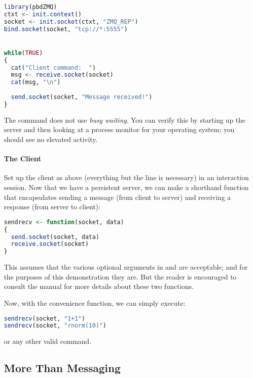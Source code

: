 \begin{lstlisting}[language=R,title=Server]
library(pbdZMQ)
ctxt <- init.context()
socket <- init.socket(ctxt, "ZMQ_REP")
bind.socket(socket, "tcp://*:5555")


while(TRUE)
{
  cat("Client command:  ")
  msg <- receive.socket(socket)
  cat(msg, "\n")
  
  send.socket(socket, "Message received!")
}
\end{lstlisting}

The  command does not use \emph{busy waiting}.  You can
verify this by starting up the server and then looking at a process monitor for
your operating system; you should see no elevated activity.


\paragraph{The Client}

Set up the client as above (everything but the  line is
necessary) in an interaction  session.  Now that we have a 
persistent server, we can make a shorthand function that encapsulates
sending a message (from client to server) and receiving a response (from
server to client):

\begin{lstlisting}[language=R,title=Client Send/Receive]
sendrecv <- function(socket, data)
{
  send.socket(socket, data)
  receive.socket(socket)
}
\end{lstlisting}

This assumes that the various optional arguments in  and
 are acceptable; and for the purposes of this 
demonstration they are.  But the reader is encouraged to consult the
 manual for more details about these two functions.

Now, with the convenience function, we can simply execute:

\begin{lstlisting}[language=R,title=Client Usage]
sendrecv(socket, "1+1")
sendrecv(socket, "rnorm(10)")
\end{lstlisting}

or any other valid  command.




\subsection{More Than Messaging}\label{fullcs}


